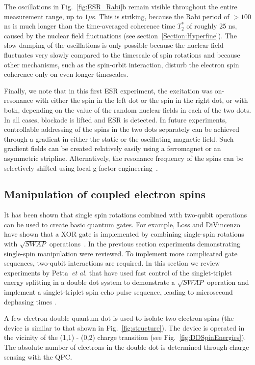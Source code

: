 \documentclass[12pt,aps,nofootinbib]{revtex4-1}
\begin{document}
The oscillations in Fig.~\ref{fig:ESR_Rabi}b remain visible
throughout the entire measurement range, up to $1 \mu$s. This is
striking, because the Rabi period of $> 100$ ns is much
longer than the time-averaged coherence time $T_2^*$ of roughly 25
ns, caused by the nuclear field fluctuations (see
section~\ref{Section:Hyperfine}). The slow damping of the
oscillations is only possible because the nuclear field fluctuates
very slowly compared to the timescale of spin rotations and
because other mechanisms, such as the spin-orbit interaction,
disturb the electron spin coherence only on even longer
timescales.

Finally, we note that in this first ESR experiment, the excitation
was on-resonance with either the spin in the left dot or the spin
in the right dot, or with both, depending on the value of the
random nuclear fields in each of the two dots. In all cases,
blockade is lifted and ESR is detected. In future experiments,
controllable addressing of the spins in the two dots separately
can be achieved through a gradient in either the static or the
oscillating magnetic field. Such gradient fields can be created
relatively easily using a ferromagnet or an asymmetric stripline.
Alternatively, the resonance frequency of the spins can be
selectively shifted using local g-factor
engineering~\cite{salis01,jiang01}.

\subsection{Manipulation of coupled electron spins}
\label{Section:Coherent:TwoSpin} It has been shown that single spin
rotations combined with two-qubit operations can be used to create
basic quantum gates. For example, Loss and DiVincenzo have shown
that a XOR gate is implemented by combining single-spin rotations
with $\sqrt{SWAP}$ operations~\cite{LossDiVincenzo}. In the previous
section experiments demonstrating single-spin manipulation were
reviewed. To implement more complicated gate sequences, two-qubit
interactions are required. In this section we review experiments by Petta~\textit{et al.} that have used fast control of the singlet-triplet energy splitting in a double dot system to demonstrate a
$\sqrt{SWAP}$ operation and implement a singlet-triplet spin echo
pulse sequence, leading to microsecond dephasing times
\cite{petta05}.

A few-electron double quantum dot is used to isolate two electron
spins (the device is similar to that shown in Fig.~\ref{fig:structure}). The device is operated in the vicinity of the
(1,1) - (0,2) charge transition (see Fig.~\ref{fig:DDSpinEnergies}). The absolute number of electrons
in the double dot is determined through charge sensing with the QPC.
\end{document}
